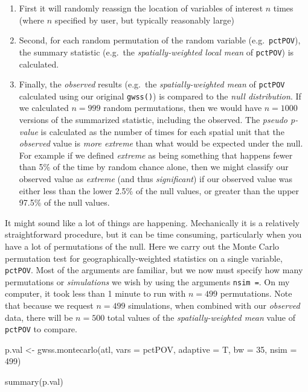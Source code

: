 \documentclass[
]{book}
\newenvironment{Shaded}{\begin{snugshade}}{\end{snugshade}}
\newcommand{\AttributeTok}[1]{\textcolor[rgb]{0.77,0.63,0.00}{#1}}
\newcommand{\DecValTok}[1]{\textcolor[rgb]{0.00,0.00,0.81}{#1}}
\newcommand{\FunctionTok}[1]{\textcolor[rgb]{0.00,0.00,0.00}{#1}}
\newcommand{\NormalTok}[1]{#1}
\newcommand{\OtherTok}[1]{\textcolor[rgb]{0.56,0.35,0.01}{#1}}
\newcommand{\StringTok}[1]{\textcolor[rgb]{0.31,0.60,0.02}{#1}}
\providecommand{\tightlist}{%
  \setlength{\itemsep}{0pt}\setlength{\parskip}{0pt}}
\begin{document}
\begin{enumerate}
\def\labelenumi{\arabic{enumi}.}
\tightlist
\item
  First it will randomly reassign the location of variables of interest \(n\) times (where \(n\) specified by user, but typically reasonably large)
\item
  Second, for each random permutation of the random variable (e.g.~\texttt{pctPOV}), the summary statistic (e.g.~the \emph{spatially-weighted local mean} of \texttt{pctPOV}) is calculated.\\
\item
  Finally, the \emph{observed} results (e.g.~the \emph{spatially-weighted mean} of \texttt{pctPOV} calculated using our original \texttt{gwss()}) is compared to the \emph{null distribution}. If we calculated \(n=999\) random permutations, then we would have \(n=1000\) versions of the summarized statistic, including the observed. The \emph{pseudo p-value} is calculated as the number of times for each spatial unit that the \emph{observed} value is \emph{more extreme} than what would be expected under the null. For example if we defined \emph{extreme} as being something that happens fewer than 5\% of the time by random chance alone, then we might classify our observed value as \emph{extreme} (and thus \emph{significant}) if our observed value was either less than the lower 2.5\% of the null values, or greater than the upper 97.5\% of the null values.
\end{enumerate}

It might sound like a lot of things are happening. Mechanically it is a relatively straightforward procedure, but it can be time consuming, particularly when you have a lot of permutations of the null. Here we carry out the Monte Carlo permutation test for geographically-weighted statistics on a single variable, \texttt{pctPOV}. Most of the arguments are familiar, but we now must specify how many permutations or \emph{simulations} we wish by using the arguments \texttt{nsim\ =}. On my computer, it took less than 1 minute to run with \(n=499\) permutations. Note that because we request \(n=499\) simulations, when combined with our \emph{observed} data, there will be \(n=500\) total values of the \emph{spatially-weighted mean} value of \texttt{pctPOV} to compare.

\begin{Shaded}
\begin{Highlighting}[]
\NormalTok{p.val }\OtherTok{\textless{}{-}} \FunctionTok{gwss.montecarlo}\NormalTok{(atl, }\AttributeTok{vars =} \StringTok{\textquotesingle{}pctPOV\textquotesingle{}}\NormalTok{, }
                         \AttributeTok{adaptive =}\NormalTok{ T,}
                         \AttributeTok{bw =} \DecValTok{35}\NormalTok{,}
                         \AttributeTok{nsim =} \DecValTok{499}\NormalTok{)}

\FunctionTok{summary}\NormalTok{(p.val)}
\end{Highlighting}
\end{Shaded}
\end{document}

